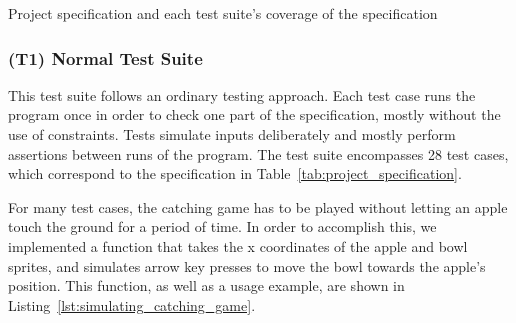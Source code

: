 \begin{table}[htpb]
    \caption{Project specification and each test suite's coverage of the specification}
    \label{tab:project_specification}
\end{table}

\subsubsection{(T1) Normal Test Suite}

This test suite follows an ordinary testing approach.
Each test case runs the program once in order to check one part of the specification,
mostly without the use of constraints.
Tests simulate inputs deliberately and mostly perform assertions between runs of the program.
The test suite encompasses 28 test cases, which correspond to the specification in Table~\ref{tab:project_specification}.
\parspace

For many test cases, the catching game has to be played without letting an apple touch the ground for a period of time.
In order to accomplish this, we implemented a function
that takes the x coordinates of the apple and bowl sprites,
and simulates arrow key presses to move the bowl towards the apple's position.
This function, as well as a usage example, are shown in Listing~\ref{lst:simulating_catching_game}.


